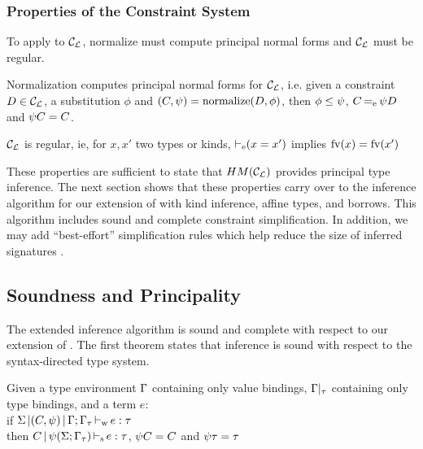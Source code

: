 \subsubsection{Properties of the Constraint System}

To apply \hmx to ${\mathcal C_{\mathcal L}}$, normalize must compute principal normal forms
and ${\mathcal C_{\mathcal L}}$ must be regular.

\begin{property}
  Normalization computes principal normal forms for ${\mathcal C_{\mathcal L}}$, i.e.
  given a constraint $D\in{\mathcal C_{\mathcal L}}$, a substitution $\phi$ and
  $(C,\mathrm{\psi}) = \operatorname{normalize}(D,\phi)$,
  then $\phi\leq\mathrm{\psi}$,
  $C \operatorname{=_e} \mathrm{\psi} D$ and
  $\mathrm{\psi} C = C$.
\end{property}

\begin{property}
  ${\mathcal C_{\mathcal L}}$ is regular, ie, for $x, x'$ two types or kinds,
  $\operatorname{\vdash_e} (x = x')$ implies
  $\operatorname{fv}(x) = \operatorname{fv}(x')$
\end{property}

These properties
are sufficient to state that $HM({\mathcal C_{\mathcal L}})$ provides principal type inference.
The next section shows that these properties carry over to the
inference algorithm for our extension
of \hmx
with kind inference, affine types, and borrows.
%
This algorithm includes sound and complete constraint simplification.
In addition, we may add ``best-effort'' simplification
rules which help reduce the size of inferred signatures 
\citep{DBLP:conf/aplas/Simonet03}.

\subsection{Soundness and Principality}

The extended inference algorithm is sound
and complete with respect to our extension of \hmx.
%
The first theorem states that inference is sound
with respect to the syntax-directed type system.

\begin{theorem}
  Given a type environment $\Gamma$ containing only value bindings,
  $\Gamma|_\tau$ containing only type bindings, and a term $e$:\\
  if $\Sigma \operatorname{|} (C,\mathrm{\psi}) \operatorname{|} \Gamma;\Gamma_\tau \operatorname{\vdash_w} e : \tau$\\
  then $C \operatorname{|} \mathrm{\psi}(\Sigma;\Gamma_\tau) \operatorname{\vdash_s} e : \tau$, $\mathrm{\psi} C = C$ and $\mathrm{\psi} \tau = \tau$
\end{theorem}

